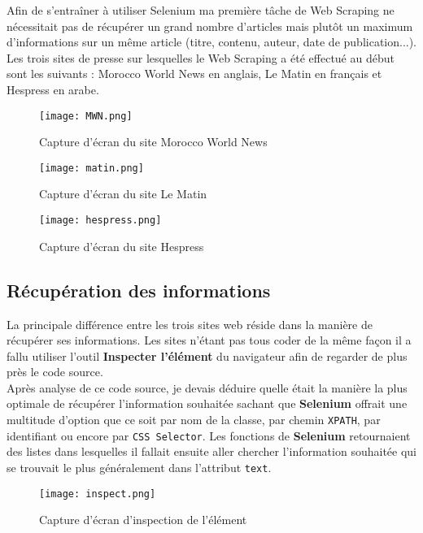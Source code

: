 \documentclass[a4paper,french,12pt]{article}
\begin{document}
Afin de s'entraîner à utiliser Selenium ma première tâche de Web Scraping ne nécessitait pas de récupérer un grand nombre d'articles mais plutôt un maximum d'informations sur un même article (titre, contenu, auteur, date de publication...).\\

Les trois sites de presse sur lesquelles le Web Scraping a été effectué au début sont les suivants : Morocco World News en anglais, Le Matin en français et Hespress en arabe.\\

\begin{figure}[!h]
    \centering
    \texttt{[image: MWN.png]}
    \caption{Capture d'écran du site Morocco World News}
\end{figure}

\begin{figure}[!h]
    \centering
    \texttt{[image: matin.png]}
    \caption{Capture d'écran du site Le Matin}
\end{figure}

\begin{figure}[!h]
    \centering
    \texttt{[image: hespress.png]}
    \caption{Capture d'écran du site Hespress}
\end{figure}

\subsection{Récupération des informations}

La principale différence entre les trois sites web réside dans la manière de récupérer ses informations. Les sites n'étant pas tous coder de la même façon il a fallu utiliser l'outil \textbf{Inspecter l'élément} du navigateur afin de regarder de plus près le code source.\\

Après analyse de ce code source, je devais déduire quelle était la manière la plus optimale de récupérer l'information souhaitée sachant que \textbf{Selenium} offrait une multitude d'option que ce soit par nom de la classe, par chemin \verb|XPATH|, par identifiant ou encore par \verb|CSS Selector|. Les fonctions de \textbf{Selenium} retournaient des listes dans lesquelles il fallait ensuite aller chercher l'information souhaitée qui se trouvait le plus généralement dans l'attribut \verb|text|.\\

\begin{figure}[!h]
    \centering
    \texttt{[image: inspect.png]}
    \caption{Capture d'écran d'inspection de l'élément}
\end{figure}\\
\end{document}
